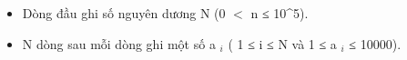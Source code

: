 \begin{itemize}
	\item     Dòng đầu ghi số nguyên dương N (0 $<$ n ≤ 10^5).   
	\item     N dòng sau mỗi dòng ghi một số a    $_     i    $    ( 1 ≤ i ≤ N và 1 ≤ a    $_     i    $    ≤ 10000).   
\end{itemize}

\